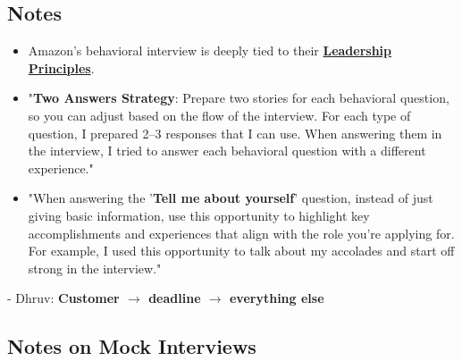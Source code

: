 \documentclass{article}
\begin{document}
\subsection{Notes}

\begin{itemize}
\item Amazon’s behavioral interview is deeply tied to their \href{https://www.amazon.jobs/content/en/our-workplace/leadership-principles}{\textbf{Leadership Principles}}.
\item "\textbf{Two Answers Strategy}: Prepare two stories for each behavioral question, so you can adjust based on the flow of the interview. For each type of question, I prepared 2–3 responses that I can use. When answering them in the interview, I tried to answer each behavioral question with a different experience."
\item "When answering the '\textbf{Tell me about yourself}' question, instead of just giving basic information, use this opportunity to highlight key accomplishments and experiences that align with the role you’re applying for. For example, I used this opportunity to talk about my accolades and start off strong in the interview."
\end{itemize}
- Dhruv: \textbf{Customer $\rightarrow$ deadline $\rightarrow$ everything else}

\subsection{Notes on Mock Interviews}
\end{document}
